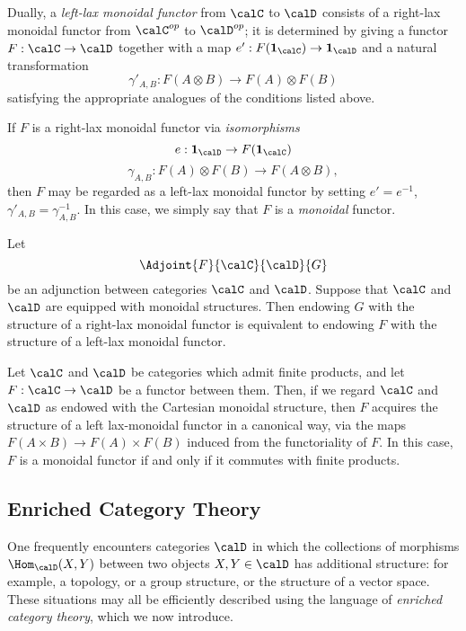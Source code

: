 Dually, a {\it left-lax monoidal functor} from $\calC$ to $\calD$ consists of a right-lax monoidal functor from $\calC^{op}$ to $\calD^{op}$; it is determined by giving a functor
$F: \calC \rightarrow \calD$ together with a map $e': F( {\bf 1_{\calC}}) \rightarrow {\bf 1}_{\calD}$
and a natural transformation
$$ \gamma'_{A,B}: F(A \otimes B) \rightarrow F(A) \otimes F(B)$$
satisfying the appropriate analogues of the conditions listed above.

If $F$ is a right-lax monoidal functor via {\em isomorphisms}
$$ e: {\bf 1}_{\calD} \rightarrow F( { \bf 1_{\calC} })$$
$$ \gamma_{A,B}: F(A) \otimes F(B) \rightarrow F(A \otimes B),$$
then $F$ may be regarded as a left-lax monoidal functor by setting $e' = e^{-1}$,
$\gamma'_{A,B} = \gamma_{A,B}^{-1}$. In this case, we simply say that $F$ is a {\em monoidal} functor.

\begin{remark}
Let 
$$ \Adjoint{F}{\calC}{\calD}{G}$$ be an adjunction between categories $\calC$ and $\calD$. Suppose that $\calC$ and $\calD$ are equipped with monoidal structures. Then endowing $G$ with the structure of a right-lax monoidal functor is equivalent to endowing $F$ with the structure of a left-lax monoidal functor.
\end{remark}

\begin{example}
Let $\calC$ and $\calD$ be categories which admit finite products, and let
$F: \calC \rightarrow \calD$ be a functor between them. Then, if we regard $\calC$ and
$\calD$ as endowed with the Cartesian monoidal structure, then $F$ acquires the structure
of a left lax-monoidal functor in a canonical way, via the maps
$F(A \times B) \rightarrow F(A) \times F(B)$ induced from the functoriality of $F$. In this case,
$F$ is a monoidal functor if and only if it commutes with finite products.
\end{example}

\subsection{Enriched Category Theory}\label{enrichcat}

One frequently encounters categories $\calD$ in which the collections of morphisms
$\Hom_{\calD}(X,Y)$ between two objects $X,Y \in \calD$ has additional structure: for example, a topology, or a group structure, or the structure of a vector space. These situations may all be efficiently described using the language of {\it enriched category theory}, which we now introduce.

